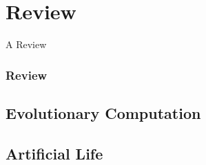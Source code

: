 \section{Review}

\frame
{
	\begin{center}
		\LARGE A Review
	\end{center}
}

\frame
{
	\frametitle{Review}
}

\subsection{Evolutionary Computation}
\subsection{Artificial Life}